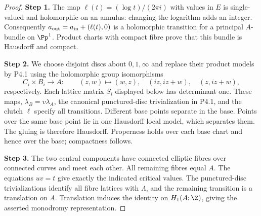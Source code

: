 \begin{proof}
\noindent\textbf{Step 1.} The map $\ell(t)=(\log t)/(2\pi i)$ with values in $E$ is single-valued and
holomorphic on an annulus: changing the logarithm adds an integer.
Consequently $a_{\rm out}=a_{\rm in}+(\ell(t),0)$ is a holomorphic transition
for a principal $A$-bundle on $\Pp^1$. Product charts with compact fibre
prove that this bundle is Hausdorff and compact.

\noindent\textbf{Step 2.} We choose disjoint discs about $0,1,\infty$ and replace their product models
by P4.1 using the holomorphic group isomorphisms
\[
 C_i\times B_i\longrightarrow A:\qquad
 (z,w)\mapsto(w,z),\quad(iz,iz+w),\quad(z,iz+w),
\]
respectively. Each lattice matrix $S_i$ displayed below has determinant
one. These maps, $\lambda_B=v\lambda_A$, the canonical punctured-disc
trivialization in P4.1, and the clutch $\ell$ specify all transitions.
Different base points separate in the base. Points over the same base
point lie in one Hausdorff local model, which separates them. The gluing is
therefore Hausdorff. Properness holds over each base chart and hence over
the base; compactness follows.

\noindent\textbf{Step 3.} The two central components have connected elliptic fibres over connected
curves and meet each other. All remaining fibres equal $A$. The equations
$uv=t$ give exactly the indicated critical values. The punctured-disc
trivializations identify all fibre lattices with $\Lambda$, and the remaining
transition is a translation on $A$. Translation induces the identity on
$H_1(A;\Z)$, giving the asserted monodromy representation.
\end{proof}

